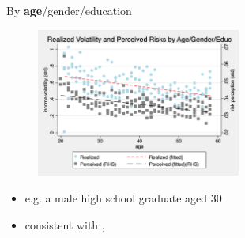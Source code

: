 \documentclass{beamer}
\begin{document}
\begin{frame}{By \textbf{age}/gender/education}
	\label{age_compare}
	\begin{figure}[ht]
		\label{compare_by_age_gender_educ}
		\centering
		\includegraphics[width=0.60\textwidth]{figures/real_log_wage_shk_gr_by_age_edu_gender_compare.png}
	\end{figure}
	\begin{itemize}
		\item e.g. a male high school graduate aged 30  
		\hyperlink{appendix:age_gender_educ_level_compare_figure}{}
		\quad  \hyperlink{appendix:age_compare_figure}{}  
		\quad  \hyperlink{appendix:age_educ_compare_figure}{}  
		\quad  \hyperlink{appendix: compare_by_cohort}{}  
		\item consistent with  \cite{moffitt2002trends}, \cite{sabelhaus2010great}
	\end{itemize}
\end{frame}
\end{document}

